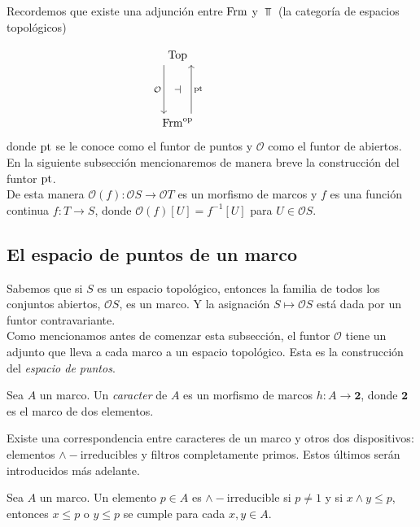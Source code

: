Recordemos que existe una adjunción entre $\mathrm{Frm}$ y $\Top$ (la categoría de espacios topológicos)

\[\begin{tikzcd}
	{\Top} \\
	{} & {} & {} \\
	{\Frm^{\op}}
	\arrow["{\pt}"{name=0, swap}, from=3-1, to=1-1, shift right=5]
	\arrow["{\mathcal{O}}"{name=1, swap}, from=1-1, to=3-1, shift right=5]
	\arrow["\dashv"{rotate=0}, from=1, to=0, phantom]
\end{tikzcd}\]
donde $\mathrm{pt}$ se le conoce como el funtor de puntos y $\mathcal{O}$ como el funtor de abiertos. En la siguiente subsección mencionaremos de manera breve la construcción del funtor $\mathrm{pt}$.\\

De esta manera $\mathcal{O}(f)\colon \mathcal{O}S\to \mathcal{O}T$ es un morfismo de marcos y $f$ es una función continua $f\colon T\to S$, donde $\mathcal{O}(f)[U]=f^{-1}[U]$ para $U\in \mathcal{O}S$.

\subsection{El espacio de puntos de un marco}\label{Epuntos}

Sabemos que si $S$ es un espacio topológico, entonces la familia de todos los conjuntos abiertos, $\mathcal{O}S$, es un marco. Y la asignación $S\mapsto \mathcal{O}S$ está dada por un funtor contravariante.\\

Como mencionamos antes de comenzar esta subsección, el funtor $\mathcal{O}$ tiene un adjunto que lleva a cada marco a un espacio topológico. Esta es la construcción del \emph{espacio de puntos}.

\begin{dfn}
    Sea $A$ un marco. Un \emph{caracter} de $A$ es un morfismo de marcos $h\colon A\to \mathbf{2}$, donde $\mathbf{2}$ es el marco de dos elementos.
\end{dfn}

Existe una correspondencia entre caracteres de un marco y otros dos dispositivos: elementos $\wedge-$irreducibles y filtros completamente primos. Estos últimos serán introducidos más adelante.

\begin{dfn}\label{infirre}
    Sea $A$ un marco. Un elemento $p\in A$ es $\wedge-$irreducible si $p\neq 1$ y si $x\wedge y\leq p$, entonces $x\leq p$ o $y\leq p$ se cumple para cada $x, y \in A$.
\end{dfn}

